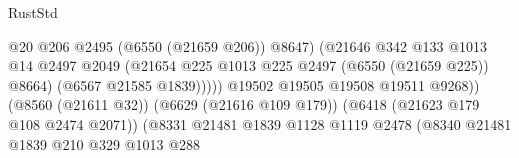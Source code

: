 \begin{lexlean}{RustStd}
\begin{coremodule}
                                                            @20
                                                            @206
                                                            @2495
                                                            (@6550 (@21659 @206))
                                                            @8647)
                                                          (@21646
                                                            @342
                                                            @133
                                                            @1013
                                                            @14
                                                            @2497
                                                            @2049
                                                            (@21654
                                                              @225
                                                              @1013
                                                              @225
                                                              @2497
                                                              (@6550 (@21659 @225))
                                                              @8664)
                                                            (@6567 @21585 @1839)))))
                                                    @19502
                                                    @19505
                                                    @19508
                                                    @19511
                                                    @9268))
                                                (@8560 (@21611 @32))
                                                (@6629 (@21616 @109 @179))
                                                (@6418 (@21623 @179 @108 @2474 @2071))
                                                (@8331
                                                  @21481
                                                  @1839
                                                  @1128
                                                  @1119
                                                  @2478
                                                  (@8340
                                                    @21481
                                                    @1839
                                                    @210
                                                    @329
                                                    @1013
                                                    @288

\end{coremodule}
\end{lexlean}
